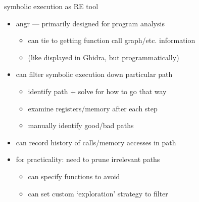 \begin{frame}{symbolic execution as RE tool}
\begin{itemize}
\item angr --- primarily designed for program analysis
    \begin{itemize}
    \item can tie to getting function call graph/etc. information
    \item (like displayed in Ghidra, but programmatically)
    \end{itemize}
\item can filter symbolic execution down particular path
    \begin{itemize}
    \item identify path + solve for how to go that way
    \item examine registers/memory after each step
    \item manually identify good/bad paths
    \end{itemize}
\item can record history of calls/memory accesses in path
\item for practicality: need to prune irrelevant paths
    \begin{itemize}
    \item can specify functions to avoid
    \item can set custom `exploration' strategy to filter
    \end{itemize}
\end{itemize}
\end{frame}


